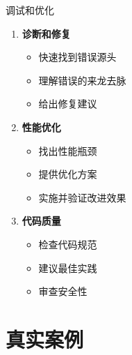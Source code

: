 \documentclass[aspectratio=169,xcolor=dvipsnames]{beamer}
\begin{document}
\begin{frame}{调试和优化}
  \begin{enumerate}
    \item \textbf{诊断和修复}
    \begin{itemize}
      \item 快速找到错误源头
      \item 理解错误的来龙去脉
      \item 给出修复建议
    \end{itemize}

    \vspace{0.3cm}

    \item \textbf{性能优化}
    \begin{itemize}
      \item 找出性能瓶颈
      \item 提供优化方案
      \item 实施并验证改进效果
    \end{itemize}

    \vspace{0.3cm}

    \item \textbf{代码质量}
    \begin{itemize}
      \item 检查代码规范
      \item 建议最佳实践
      \item 审查安全性
    \end{itemize}
  \end{enumerate}
\end{frame}

\section{真实案例}
\end{document}
